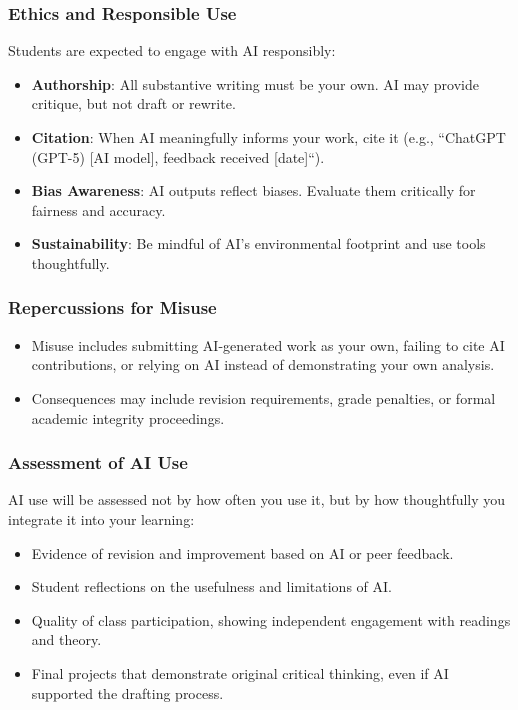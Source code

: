 \documentclass[12pt, letterpaper]{article}
\begin{document}
\subsubsection*{Ethics and Responsible Use}

\noindent Students are expected to engage with AI responsibly:

\begin{itemize}
    \item \textbf{Authorship}: All substantive writing must be your own. AI may provide critique, but not draft or rewrite.
    \item \textbf{Citation}: When AI meaningfully informs your work, cite it (e.g., ``ChatGPT (GPT-5) [AI model], feedback received [date]``).
    \item \textbf{Bias Awareness}: AI outputs reflect biases. Evaluate them critically for fairness and accuracy.
    \item \textbf{Sustainability}: Be mindful of AI's environmental footprint and use tools thoughtfully.
\end{itemize}

\subsubsection*{Repercussions for Misuse}

\begin{itemize}
    \item Misuse includes submitting AI-generated work as your own, failing to cite AI contributions, or relying on AI instead of demonstrating your own analysis.
    \item Consequences may include revision requirements, grade penalties, or formal academic integrity proceedings.
\end{itemize}

\subsubsection*{Assessment of AI Use}

AI use will be assessed not by how often you use it, but by how thoughtfully you integrate it into your learning:

\begin{itemize}
    \item Evidence of revision and improvement based on AI or peer feedback.
    \item Student reflections on the usefulness and limitations of AI.
    \item Quality of class participation, showing independent engagement with readings and theory.
    \item Final projects that demonstrate original critical thinking, even if AI supported the drafting process.
\end{itemize}
\end{document}
